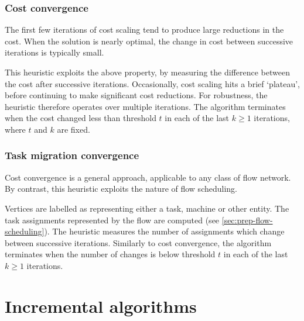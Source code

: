 \subsubsection{Cost convergence}


The first few iterations of cost scaling tend to produce large reductions in the cost. When the solution is nearly optimal, the change in cost between successive iterations is typically small.

This heuristic exploits the above property, by measuring the difference between the cost after successive iterations. Occasionally, cost scaling hits a brief `plateau', before continuing to make significant cost reductions. For robustness, the heuristic therefore operates over multiple iterations. The algorithm terminates when the cost changed less than threshold $t$ in each of the last $k \geq 1$ iterations, where $t$ and $k$ are fixed.

\subsubsection{Task migration convergence}

Cost convergence is a general approach, applicable to any class of flow network. By contrast, this heuristic exploits the nature of flow scheduling.

Vertices are labelled as representing either a task, machine or other entity. The task assignments represented by the flow are computed (see \cref{sec:prep-flow-scheduling}). The heuristic measures the number of assignments which change between successive iterations. Similarly to cost convergence, the algorithm terminates when the number of changes is below threshold $t$ in each of the last $k \geq 1$ iterations.


\section{Incremental algorithms} \label{sec:impl-incremental}

